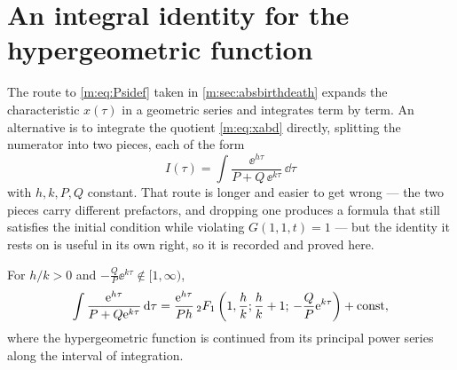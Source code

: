 \renewcommand{\thesection}{\thechapter.\Alph{section}}
\setcounter{section}{0}

\section{An integral identity for the hypergeometric function}
\label{m:app:hyp}

The route to \cref{m:eq:Psidef} taken in \cref{m:sec:absbirthdeath} expands the
characteristic $x(\tau)$ in a geometric series and integrates term by term. An
alternative is to integrate the quotient \cref{m:eq:xabd} directly, splitting the
numerator into two pieces, each of the form
\begin{equation}
\label{m:eq:Iform}
I(\tau) = \int\frac{\ee^{h\tau}}{P+Q\,\ee^{k\tau}}\,\dd\tau
\end{equation}
with $h,k,P,Q$ constant. That route is longer and easier to get wrong --- the two
pieces carry different prefactors, and dropping one produces a formula that still
satisfies the initial condition while violating $G(1,1,t)=1$ --- but the identity it
rests on is useful in its own right, so it is recorded and proved here.

\begin{proposition}
\label{m:prop:hypIden}
For $h/k>0$ and $-\tfrac{Q}{P}\ee^{k\tau}\notin[1,\infty)$,
\begin{equation}
\label{m:eq:hypIden}
\int\frac{\mathrm{e}^{h\tau}}{P+Q\mathrm{e}^{k\tau}}\,\mathrm{d}\tau
= \frac{\mathrm{e}^{h\tau}}{Ph}\,{}_2F_1\left(1,\frac{h}{k};\frac{h}{k}+1;\,-\frac{Q}{P}\mathrm{e}^{k\tau}\right)
+ \text{const} ,
\end{equation}
where the hypergeometric function is continued from its principal power series
along the interval of integration.
\end{proposition}

